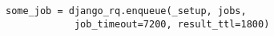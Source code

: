 \begin{minipage}{0.95\linewidth}
    \begin{lstlisting}[caption={Example of a timeout.},label={killabnormaltaskscode}]
    some_job = django_rq.enqueue(_setup, jobs, 
            job_timeout=7200, result_ttl=1800)
    \end{lstlisting}
\end{minipage}